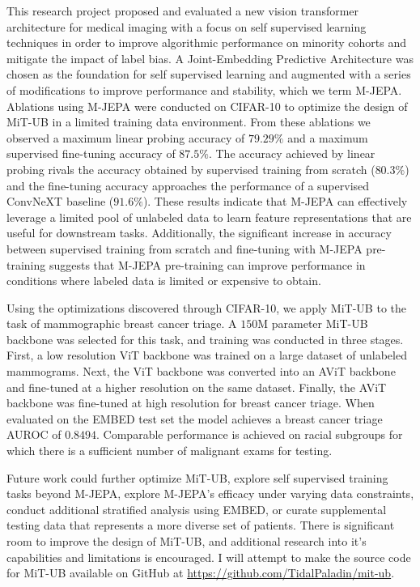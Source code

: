 \documentclass[12pt]{article}
\begin{document}
This research project proposed and evaluated a new vision transformer architecture for medical imaging with a focus on
self supervised learning techniques in order to improve algorithmic performance on minority cohorts and mitigate the impact of label bias.
A Joint-Embedding Predictive Architecture was chosen as the foundation for self supervised learning and augmented with a series of modifications to improve performance and stability, which we term M-JEPA. Ablations using M-JEPA were conducted on CIFAR-10 to optimize the design of MiT-UB in a limited training data environment. From these ablations we observed a maximum linear probing accuracy of $79.29\%$ and a maximum supervised fine-tuning accuracy of $87.5\%$. The accuracy achieved by linear probing rivals the accuracy obtained by supervised training from scratch ($80.3\%$) and the fine-tuning accuracy approaches the performance of a supervised ConvNeXT baseline ($91.6\%$). These results indicate that M-JEPA can effectively leverage a limited pool of unlabeled data to learn feature representations that are useful for downstream tasks.
Additionally, the significant increase in accuracy between supervised training from scratch and fine-tuning with M-JEPA pre-training suggests that M-JEPA pre-training can improve performance in conditions where labeled data is limited or expensive to obtain.

Using the optimizations discovered through CIFAR-10, we apply MiT-UB to the task of mammographic breast cancer triage. 
A $150\mathrm{M}$ parameter MiT-UB backbone was selected for this task, and training was conducted in three stages. First, a low resolution ViT backbone was trained on a large dataset of unlabeled mammograms. Next, the ViT backbone was converted into an AViT backbone and fine-tuned at a higher resolution on the same dataset. Finally, the AViT backbone was fine-tuned at high resolution for breast cancer triage.
When evaluated on the EMBED test set the model achieves a breast cancer triage AUROC of $0.8494$. Comparable performance is achieved on racial subgroups for which there is a sufficient number of malignant exams for testing.

Future work could further optimize MiT-UB, explore self supervised training tasks beyond M-JEPA, explore M-JEPA's efficacy under varying data constraints, conduct additional stratified analysis using EMBED, or curate supplemental testing data that represents a more diverse set of patients.
There is significant room to improve the design of MiT-UB, and additional research into it's capabilities and limitations is encouraged.
I will attempt to make the source code for MiT-UB available on GitHub at \href{https://github.com/TidalPaladin/mit-ub}{https://github.com/TidalPaladin/mit-ub}.
\end{document}
